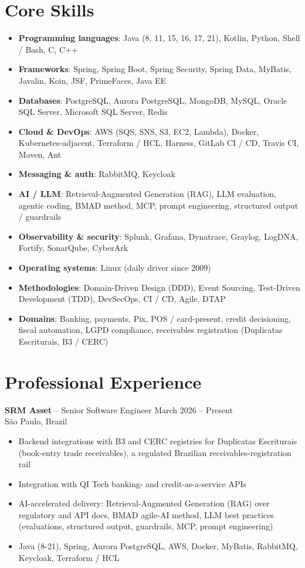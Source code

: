 \documentclass[10pt,a4paper]{article}
\begin{document}
\section{Core Skills}
\begin{itemize}
\item \textbf{Programming languages}: Java (8, 11, 15, 16, 17, 21), Kotlin, Python, Shell / Bash, C, C++
\item \textbf{Frameworks}: Spring, Spring Boot, Spring Security, Spring Data, MyBatis, Javalin, Koin, JSF, PrimeFaces, Java EE
\item \textbf{Databases}: PostgreSQL, Aurora PostgreSQL, MongoDB, MySQL, Oracle SQL Server, Microsoft SQL Server, Redis
\item \textbf{Cloud \& DevOps}: AWS (SQS, SNS, S3, EC2, Lambda), Docker, Kubernetes-adjacent, Terraform / HCL, Harness, GitLab CI / CD, Travis CI, Maven, Ant
\item \textbf{Messaging \& auth}: RabbitMQ, Keycloak
\item \textbf{AI / LLM}: Retrieval-Augmented Generation (RAG), LLM evaluation, agentic coding, BMAD method, MCP, prompt engineering, structured output / guardrails
\item \textbf{Observability \& security}: Splunk, Grafana, Dynatrace, Graylog, LogDNA, Fortify, SonarQube, CyberArk
\item \textbf{Operating systems}: Linux (daily driver since 2009)
\item \textbf{Methodologies}: Domain-Driven Design (DDD), Event Sourcing, Test-Driven Development (TDD), DevSecOps, CI / CD, Agile, DTAP
\item \textbf{Domains}: Banking, payments, Pix, POS / card-present, credit decisioning, fiscal automation, LGPD compliance, receivables registration (Duplicatas Escriturais, B3 / CERC)
\end{itemize}

\section{Professional Experience}

\noindent\textbf{SRM Asset} -- Senior Software Engineer \hfill March 2026 -- Present\\
São Paulo, Brazil
\begin{itemize}
\item Backend integrations with B3 and CERC registries for Duplicatas Escriturais (book-entry trade receivables), a regulated Brazilian receivables-registration rail
\item Integration with QI Tech banking- and credit-as-a-service APIs
\item AI-accelerated delivery: Retrieval-Augmented Generation (RAG) over regulatory and API docs, BMAD agile-AI method, LLM best practices (evaluations, structured output, guardrails, MCP, prompt engineering)
\item Java (8-21), Spring, Aurora PostgreSQL, AWS, Docker, MyBatis, RabbitMQ, Keycloak, Terraform / HCL
\end{itemize}
\end{document}
